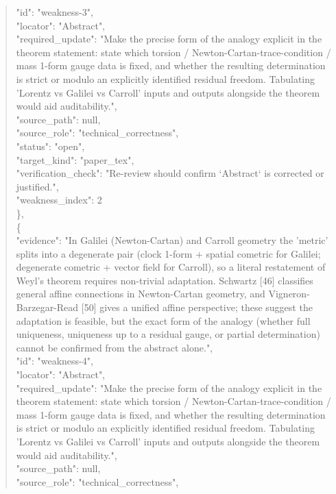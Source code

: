 \documentclass[11pt]{article}
\begin{document}
\begin{quote}
      "id": "weakness-3",\\
      "locator": "Abstract",\\
      "required\_update": "Make the precise form of the analogy explicit in the theorem statement: state which torsion / Newton-Cartan-trace-condition / mass 1-form gauge data is fixed, and whether the resulting determination is strict or modulo an explicitly identified residual freedom. Tabulating 'Lorentz vs Galilei vs Carroll' inputs and outputs alongside the theorem would aid auditability.",\\
      "source\_path": null,\\
      "source\_role": "technical\_correctness",\\
      "status": "open",\\
      "target\_kind": "paper\_tex",\\
      "verification\_check": "Re-review should confirm `Abstract` is corrected or justified.",\\
      "weakness\_index": 2\\
    \},\\
    \{\\
      "evidence": "In Galilei (Newton-Cartan) and Carroll geometry the 'metric' splits into a degenerate pair (clock 1-form + spatial cometric for Galilei; degenerate cometric + vector field for Carroll), so a literal restatement of Weyl's theorem requires non-trivial adaptation. Schwartz [46] classifies general affine connections in Newton-Cartan geometry, and Vigneron-Barzegar-Read [50] gives a unified affine perspective; these suggest the adaptation is feasible, but the exact form of the analogy (whether full uniqueness, uniqueness up to a residual gauge, or partial determination) cannot be confirmed from the abstract alone.",\\
      "id": "weakness-4",\\
      "locator": "Abstract",\\
      "required\_update": "Make the precise form of the analogy explicit in the theorem statement: state which torsion / Newton-Cartan-trace-condition / mass 1-form gauge data is fixed, and whether the resulting determination is strict or modulo an explicitly identified residual freedom. Tabulating 'Lorentz vs Galilei vs Carroll' inputs and outputs alongside the theorem would aid auditability.",\\
      "source\_path": null,\\
      "source\_role": "technical\_correctness",\\

\end{quote}
\end{document}
